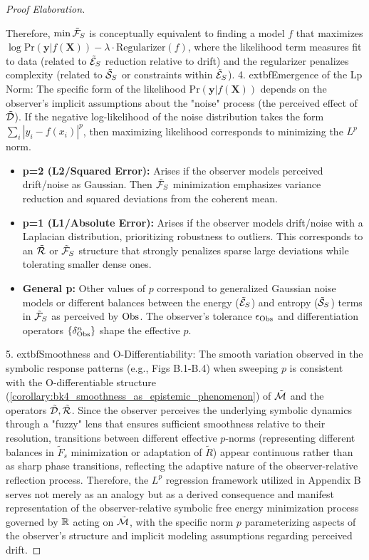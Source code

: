 \begin{proof}[Proof Elaboration]
\begin{itemize}
    \end{itemize}
    Therefore, \( \min \tilde{\mathcal{F}}_S \) is conceptually equivalent to finding a model \( f \) that maximizes \( \log \mathrm{Pr}(\mathbf{y} | f(\mathbf{X})) - \lambda \cdot \text{Regularizer}(f) \), where the likelihood term measures fit to data (related to \( \tilde{\mathcal{E}}_S \) reduction relative to drift) and the regularizer penalizes complexity (related to \( \tilde{\mathcal{S}}_S \) or constraints within \( \tilde{\mathcal{E}}_S \)).
4.  	extbf{Emergence of the Lp Norm:} The specific form of the likelihood \( \mathrm{Pr}(\mathbf{y} | f(\mathbf{X})) \) depends on the observer's implicit assumptions about the "noise" process (the perceived effect of \( \tilde{\mathcal{D}} \)). If the negative log-likelihood of the noise distribution takes the form \( \sum_i \left|y_i - f(x_i)\right|^p \), then maximizing likelihood corresponds to minimizing the \( L^p \) norm.
    \begin{itemize}
        \item \textbf{p=2 (L2/Squared Error):} Arises if the observer models perceived drift/noise as Gaussian. Then $\tilde{\mathcal{F}}_S$ minimization emphasizes variance reduction and squared deviations from the coherent mean.
        \item \textbf{p=1 (L1/Absolute Error):} Arises if the observer models drift/noise with a Laplacian distribution, prioritizing robustness to outliers. This corresponds to an $\tilde{\mathcal{R}}$ or $\tilde{\mathcal{F}}_S$ structure that strongly penalizes sparse large deviations while tolerating smaller dense ones.
        \item \textbf{General p:} Other values of $p$ correspond to generalized Gaussian noise models or different balances between the energy ($\tilde{\mathcal{E}}_S$) and entropy ($\tilde{\mathcal{S}}_S$) terms in $\tilde{\mathcal{F}}_S$ as perceived by $\mathrm{Obs}$. The observer's tolerance $\epsilon_{\mathrm{Obs}}$ and differentiation operators $\{\delta^n_{\mathrm{Obs}}\}$ shape the effective $p$.
    \end{itemize}
5. 	extbf{Smoothness and O-Differentiability:} The smooth variation observed in the symbolic response patterns (e.g., Figs B.1-B.4) when sweeping \( p \) is consistent with the O-differentiable structure (\ref{corollary:bk4_smoothness_as_epistemic_phenomenon}) of \( \tilde{\mathcal{M}} \) and the operators \( \tilde{\mathcal{D}}, \tilde{\mathcal{R}} \). Since the observer perceives the underlying symbolic dynamics through a "fuzzy" lens that ensures sufficient smoothness relative to their resolution, transitions between different effective \( p \)-norms (representing different balances in \( \tilde{F}_s \) minimization or adaptation of \( \tilde{R} \)) appear continuous rather than as sharp phase transitions, reflecting the adaptive nature of the observer-relative reflection process.
Therefore, the \( L^p \) regression framework utilized in Appendix B serves not merely as an analogy but as a derived consequence and manifest representation of the observer-relative symbolic free energy minimization process governed by \( \mathbb{R} \) acting on \( \tilde{\mathcal{M}} \), with the specific norm \( p \) parameterizing aspects of the observer's structure and implicit modeling assumptions regarding perceived drift.
\end{proof}
